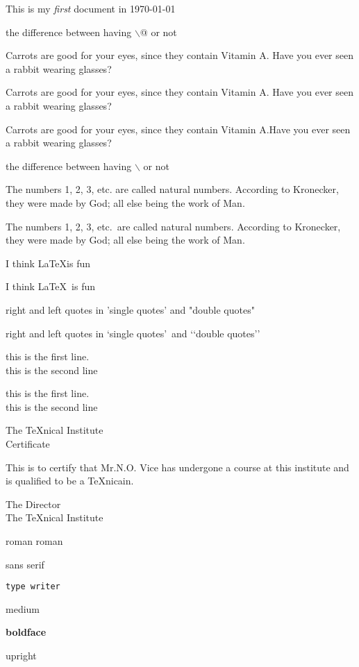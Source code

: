 \documentclass[a4paper, UTF8]{article}
\begin{document}
\noindent This is my \emph{first} document in \today

the difference between having $\backslash$@ or not

Carrots are good for your eyes, since they contain Vitamin A. Have you ever seen a rabbit wearing glasses?

Carrots are good for your eyes, since they contain Vitamin A\@. Have you ever seen a rabbit wearing glasses?

Carrots are good for your eyes, since they contain Vitamin A.\@ Have you ever seen a rabbit wearing glasses?

the difference between having $\backslash$ or not

The numbers 1, 2, 3, etc. are called natural numbers. According to Kronecker, they were made by God; all else being the work of Man.

The numbers 1, 2, 3, etc.\ are called natural numbers. According to Kronecker, they were made by God; all else being the work of Man.

I think \LaTeX is fun

I think \LaTeX\ is fun

right and left quotes in 'single quotes' and "double quotes"

right and left quotes in \lq single quotes\rq\ and \lq\lq double quotes\rq\rq

this is the first line.\\ this is the second line

this is the first line. \\[10pt] this is the second line

\begin{center}
    The \TeX nical Institute\\[0.75cm]
    Certificate
\end{center}
\noindent This is to certify that Mr.N.O. Vice has undergone a course at this institute and is qualified to be a \TeX nicain.
\begin{flushright}
    The Director\\
    The \TeX nical Institute
\end{flushright}

\textrm{roman}  {\rmfamily roman}

\textsf{sans serif}

\texttt{type writer}

\textmd{medium}

\textbf{boldface}

\textup{upright}
\end{document}
